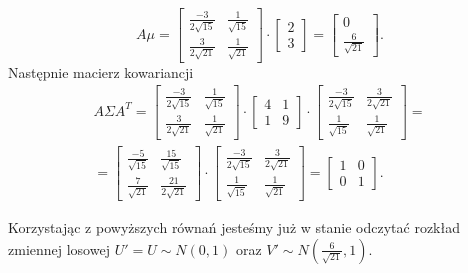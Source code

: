\documentclass[12pt,a4paper]{article}
\begin{document}
\[
	A\mu = \left[ \begin{array}{cc}
			\frac{-3}{2\sqrt{15}} & \frac{1}{\sqrt{15}} \\
			\frac{3}{2\sqrt{21}}  & \frac{1}{\sqrt{21}} 
		\end{array}	 \right] \cdot 
		\left[ \begin{array}{cc}
			2 \\
			3
		\end{array} \right]	=
		\left[ \begin{array}{c}
			0 \\
			\frac{6}{\sqrt{21}}
		\end{array}	\right].
\]
Następnie macierz kowariancji
\begin{gather*}
	A \Sigma A^T = \left[ \begin{array}{cc}
			\frac{-3}{2\sqrt{15}} & \frac{1}{\sqrt{15}} \\
			\frac{3}{2\sqrt{21}}  & \frac{1}{\sqrt{21}} 
		\end{array}	 \right] \cdot \left[ \begin{array}{cc}
			4 & 1 \\
			1 & 9
		\end{array} \right] \cdot \left[ \begin{array}{cc}
			\frac{-3}{2\sqrt{15}} & \frac{3}{2\sqrt{21}} \\
			\frac{1}{\sqrt{15}}  & \frac{1}{\sqrt{21}} 
		\end{array}	 \right] = \\ =
		\left[ \begin{array}{cc}
			\frac{-5}{\sqrt{15}} & \frac{15}{\sqrt{15}} \\
			\frac{7}{\sqrt{21}}  & \frac{21}{2\sqrt{21}} 
		\end{array}	 \right] \cdot 
		\left[ \begin{array}{cc}
			\frac{-3}{2\sqrt{15}} & \frac{3}{2\sqrt{21}} \\
			\frac{1}{\sqrt{15}}  & \frac{1}{\sqrt{21}} 
		\end{array}	 \right] = \left[ \begin{array}{cc}
			1 & 0 \\
			0 & 1 		
		\end{array}		 \right].
\end{gather*}

\noindent
Korzystając z powyższych równań jesteśmy już w stanie odczytać rozkład zmiennej losowej \( U' = U \sim N(0,1) \) oraz \( V' \sim N \left( \frac{6}{\sqrt{21}}, 1 \right)  \). 
\end{document}
